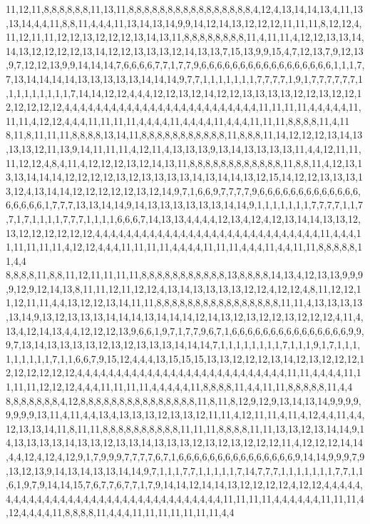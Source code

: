 11,12,11,8,8,8,8,8,8,11,13,11,8,8,8,8,8,8,8,8,8,8,8,8,8,8,8,8,4,12,4,13,14,14,13,4,11,13,13,14,4,4,11,8,8,11,4,4,4,11,13,14,13,14,9,9,14,12,14,13,12,12,12,11,11,11,8,12,12,4,11,12,11,11,12,12,13,12,12,12,13,14,13,11,8,8,8,8,8,8,8,8,11,4,11,11,4,12,12,13,13,14,14,13,12,12,12,12,13,14,12,12,13,13,13,12,14,13,13,7,15,13,9,9,15,4,7,12,13,7,9,12,13,9,7,12,12,13,9,9,14,14,14,7,6,6,6,6,7,7,1,7,7,9,6,6,6,6,6,6,6,6,6,6,6,6,6,6,6,6,6,1,1,1,7,7,13,14,14,14,14,13,13,13,13,13,14,14,14,9,7,7,1,1,1,1,1,1,1,7,7,7,7,1,9,1,7,7,7,7,7,7,1,1,1,1,1,1,1,1,1,7,14,14,12,12,4,4,4,12,12,13,12,14,12,12,13,13,13,13,12,12,13,12,12,12,12,12,12,12,4,4,4,4,4,4,4,4,4,4,4,4,4,4,4,4,4,4,4,4,4,4,4,4,4,11,11,11,11,4,4,4,4,4,11,11,11,4,12,12,4,4,4,11,11,11,11,4,4,4,4,11,4,4,4,4,11,4,4,4,11,11,11,8,8,8,8,11,4,11
8,11,8,11,11,11,8,8,8,8,13,14,11,8,8,8,8,8,8,8,8,8,8,8,11,8,8,8,11,14,12,12,12,13,14,13,13,13,12,11,13,9,14,11,11,11,4,12,11,4,13,13,13,9,13,14,13,13,13,13,11,4,4,12,11,11,11,12,12,4,8,4,11,4,12,12,12,13,12,14,13,11,8,8,8,8,8,8,8,8,8,8,8,8,11,8,8,11,4,12,13,13,13,14,14,14,12,12,12,12,13,12,13,13,13,13,14,13,14,14,13,12,15,14,12,12,13,13,13,13,12,4,13,14,14,12,12,12,12,12,13,12,14,9,7,1,6,6,9,7,7,7,7,9,6,6,6,6,6,6,6,6,6,6,6,6,6,6,6,6,6,6,1,7,7,7,13,13,14,14,9,14,13,13,13,13,13,13,14,14,9,1,1,1,1,1,1,1,7,7,7,7,1,1,7,7,1,7,1,1,1,1,7,7,7,1,1,1,1,6,6,6,7,14,13,13,4,4,4,4,12,13,4,12,4,12,13,14,14,13,13,12,13,12,12,12,12,12,12,4,4,4,4,4,4,4,4,4,4,4,4,4,4,4,4,4,4,4,4,4,4,4,4,4,4,4,4,4,11,4,4,4,11,11,11,11,11,4,12,12,4,4,4,11,11,11,11,4,4,4,4,11,11,11,4,4,4,11,4,4,11,11,8,8,8,8,8,11,4,4
8,8,8,8,11,8,8,11,12,11,11,11,11,8,8,8,8,8,8,8,8,8,8,8,13,8,8,8,8,14,13,4,12,13,13,9,9,9,9,12,9,12,14,13,8,11,11,12,11,12,12,4,13,14,13,13,13,13,12,12,4,12,12,4,8,11,12,12,11,12,11,11,4,4,13,12,12,13,14,11,11,8,8,8,8,8,8,8,8,8,8,8,8,8,8,8,8,11,11,4,13,13,13,13,13,14,9,13,12,13,13,13,14,14,14,13,14,14,14,12,14,13,12,13,12,12,13,12,12,12,4,11,4,13,4,12,14,13,4,4,12,12,12,13,9,6,6,1,9,7,1,7,7,9,6,7,1,6,6,6,6,6,6,6,6,6,6,6,6,6,6,6,9,9,9,7,13,14,13,13,13,13,12,13,12,13,13,13,14,14,14,7,1,1,1,1,1,1,1,1,7,1,1,1,9,1,7,1,1,1,1,1,1,1,1,1,7,1,1,6,6,7,9,15,12,4,4,4,13,15,15,15,13,13,12,12,12,13,14,12,13,12,12,12,12,12,12,12,12,12,4,4,4,4,4,4,4,4,4,4,4,4,4,4,4,4,4,4,4,4,4,4,4,4,4,4,4,11,11,4,4,4,4,11,11,11,11,12,12,12,4,4,4,11,11,11,11,4,4,4,4,4,11,8,8,8,8,11,4,4,11,11,8,8,8,8,8,11,4,4
8,8,8,8,8,8,8,4,12,8,8,8,8,8,8,8,8,8,8,8,8,8,8,8,11,8,11,8,12,9,12,9,13,14,13,14,9,9,9,9,9,9,9,9,13,11,4,11,4,4,13,4,13,13,13,12,13,13,12,11,11,4,12,11,11,4,11,4,12,4,4,11,4,4,12,13,13,14,11,8,11,11,8,8,8,8,8,8,8,8,8,8,11,11,11,8,8,8,8,11,11,13,13,12,13,14,14,9,14,13,13,13,13,14,13,13,12,13,13,14,13,13,13,12,13,12,13,12,12,12,11,4,12,12,12,14,14,4,4,12,4,12,4,12,9,1,7,9,9,9,7,7,7,7,6,7,1,6,6,6,6,6,6,6,6,6,6,6,6,6,6,6,9,14,14,9,9,9,7,9,13,12,13,9,14,13,14,13,13,14,14,9,7,1,1,1,7,7,1,1,1,1,1,7,14,7,7,7,1,1,1,1,1,1,1,7,7,1,1,6,1,9,7,9,14,14,15,7,6,7,7,6,7,7,1,7,9,14,14,12,14,14,13,12,12,12,12,4,12,12,4,4,4,4,4,4,4,4,4,4,4,4,4,4,4,4,4,4,4,4,4,4,4,4,4,4,4,4,4,4,4,4,4,11,11,11,11,4,4,4,4,4,4,11,11,11,4,12,4,4,4,4,11,8,8,8,8,11,4,4,4,11,11,11,11,11,11,11,4,4
